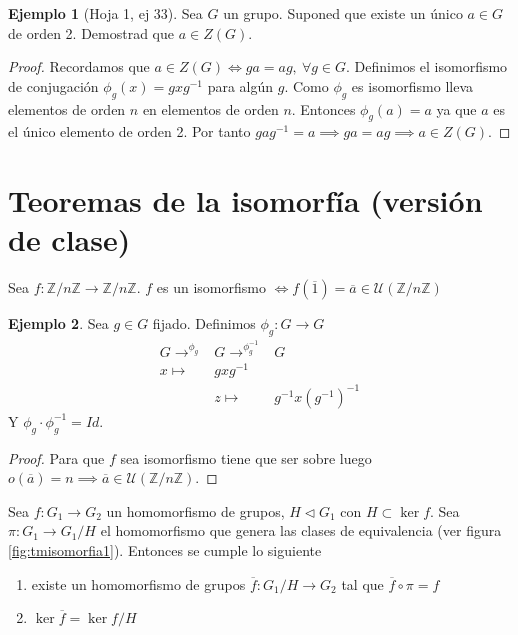\documentclass{book}
\theoremstyle{definition}
\newtheorem{ej}{Ejemplo}
\theoremstyle{remark}
\newcommand{\normsub}{\mathbin{\triangleleft}}
\newcommand{\uds}[1]{\mathcal{U}(#1)}
\newcommand{\inv}[1]{#1^{-1}}
\newcommand{\ZnZ}{\mathbb{Z}/n\mathbb{Z}}
\begin{document}
\begin{ej}[Hoja 1, ej 33]
	Sea $G$ un grupo. Suponed que existe un único $a \in G$ de orden 2. Demostrad que $a \in Z(G)$.
\end{ej}

\begin{proof}
	Recordamos que $a \in Z(G) \iff ga = ag,\ \forall g \in G$. Definimos el isomorfismo de conjugación $\phi_g (x) = gx\inv{g}$ para algún $g$. Como $\phi_g$ es isomorfismo lleva elementos de orden $n$ en elementos de orden $n$. Entonces $\phi_g(a) = a$ ya que $a$ es el único elemento de orden 2. Por tanto $ga\inv{g} = a \implies ga = ag \implies a \in Z(G)$.
\end{proof}

\section{Teoremas de la isomorfía (versión de clase)}

\begin{thm}[O ejemplo]
	Sea $f: \ZnZ \to \ZnZ$. $f$ es un isomorfismo $\iff f(\overline{1}) = \overline{a} \in \uds{\ZnZ}$
\end{thm}

\begin{ej}
	Sea $g \in G$ fijado. Definimos $\phi_g : G \to G$
	\begin{align*}
		G \to^{\phi_g} & G \to^{\phi^{-1}_g} & G \\
		x \mapsto &gx\inv{g} & \\
		&z \mapsto &\inv{g}x\inv{(\inv{g})}
	\end{align*}
	Y $\phi_g \cdot \phi_g^{-1} = Id$.
\end{ej}

\begin{proof}
	Para que $f$ sea isomorfismo tiene que ser sobre luego $o(\overline{a}) = n \implies \overline{a} \in \uds{\ZnZ}$.
\end{proof}

\begin{thm}
	\label{teorema:preisomorfia1}
	Sea $f: G_1 \to G_2$ un homomorfismo de grupos, $H \normsub G_1$ con $H \subset \ker f$. Sea $\pi: G_1 \to G_1/H$ el homomorfismo que genera las clases de equivalencia (ver figura \ref{fig:tmisomorfia1}). Entonces se cumple lo siguiente
	\begin{enumerate}
		\item existe un homomorfismo de grupos $\overline{f}:G_1/H \to G_2$ tal que $\overline{f} \circ \pi = f$
		\item $\ker \overline{f} = \ker f / H$
	\end{enumerate}
\end{thm}
\end{document}

